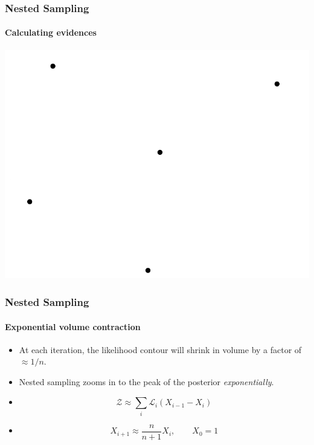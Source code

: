 \documentclass[]{beamer}
\newcommand{\lik}{\mathcal{L}}
\newcommand{\ev}{\mathcal{Z}}
\begin{document}
\begin{frame}
  \frametitle{Nested Sampling}
  \framesubtitle{Calculating evidences}
  \includegraphics[width=\textwidth,page=38]{figures/nested_sampling}
\end{frame}



\begin{frame}
  \frametitle{Nested Sampling} 
  \framesubtitle{Exponential volume contraction} 
  
  \begin{itemize}
      \pause
    \item At each iteration, the likelihood contour will shrink in volume by a factor of $\approx 1/n$.
      \pause
    \item Nested sampling zooms in to the peak of the posterior {\em exponentially}.
      \pause
    \item 
      \begin{equation}
        \ev \approx \sum_i \lik_i (X_{i-1} - X_{i})
      \end{equation}
      \pause
    \item 
      \begin{equation}
        X_{i+1} \approx \frac{n}{n+1}X_i, \qquad X_{0} = 1
      \end{equation}
  \end{itemize}
  
\end{frame}
\end{document}
